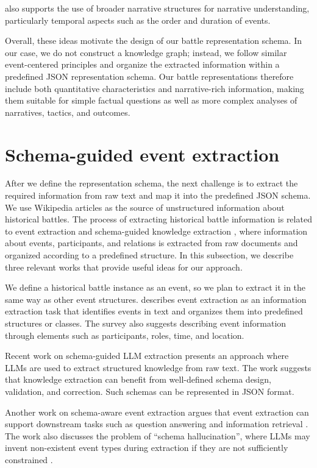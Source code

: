 \citet{hamilton2026narrabench} also supports the use of broader narrative structures for narrative understanding, particularly temporal aspects such as the order and duration of events.

Overall, these ideas motivate the design of our battle representation schema. In our case, we do not construct a knowledge graph; instead, we follow similar event-centered principles and organize the extracted information within a predefined JSON representation schema. Our battle representations therefore include both quantitative characteristics and narrative-rich information, making them suitable for simple factual questions as well as more complex analyses of narratives, tactics, and outcomes.
\section{Schema-guided event extraction}
After we define the representation schema, the next challenge is to extract the required information from raw text and map it into the predefined JSON schema. We use Wikipedia articles as the source of unstructured information about historical battles. The process of extracting historical battle information is related to event extraction \citep{lai2022eventextraction} and schema-guided knowledge extraction \citep{luo2025oneke}, where information about events, participants, and relations is extracted from raw documents and organized according to a predefined structure. In this subsection, we describe three relevant works that provide useful ideas for our approach.

We define a historical battle instance as an event, so we plan to extract it in the same way as other event structures. \citet{lai2022eventextraction} describes event extraction as an information extraction task that identifies events in text and organizes them into predefined structures or classes. The survey also suggests describing event information through elements such as participants, roles, time, and location.

Recent work on schema-guided LLM extraction \citep{luo2025oneke} presents an approach where LLMs are used to extract structured knowledge from raw text. The work suggests that knowledge extraction can benefit from well-defined schema design, validation, and correction. Such schemas can be represented in JSON format.

Another work on schema-aware event extraction argues that event extraction can support downstream tasks such as question answering and information retrieval \citep{liang2025asee}. The work also discusses the problem of “schema hallucination”, where LLMs may invent non-existent event types during extraction if they are not sufficiently constrained \citep{liang2025asee}. 


